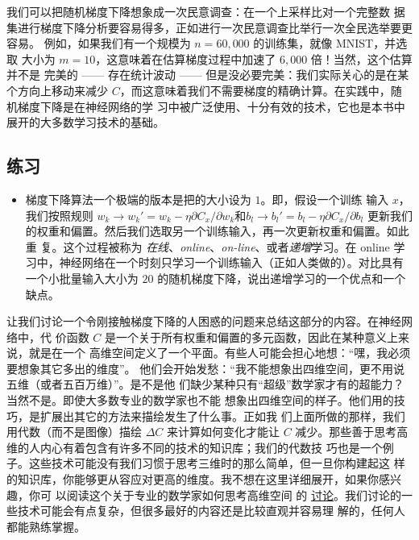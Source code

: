 我们可以把随机梯度下降想象成一次民意调查：在一个\minibatch{}上采样比对一个完整数
据集进行梯度下降分析要容易得多，正如进行一次民意调查比举行一次全民选举要更容易。
例如，如果我们有一个规模为 $n = 60,000$ 的训练集，就像 MNIST，并选取\minibatch{}
大小为 $m = 10$，这意味着在估算梯度过程中加速了 $6,000$ 倍！当然，这个估算并不是
完美的 —— 存在统计波动 —— 但是没必要完美：我们实际关心的是在某个方向上移动来减少
$C$，而这意味着我们不需要梯度的精确计算。在实践中，随机梯度下降是在神经网络的学
习中被广泛使用、十分有效的技术，它也是本书中展开的大多数学习技术的基础。

\subsection*{练习}

\begin{itemize}
\item 梯度下降算法一个极端的版本是把\minibatch{}的大小设为 $1$。即，假设一个训练
  输入 $x$，我们按照规则 $w_k \rightarrow w_k' = w_k - \eta \partial C_x /
  \partial w_k$和$b_l \rightarrow b_l' = b_l - \eta \partial C_x / \partial b_l$
  更新我们的权重和偏置。然后我们选取另一个训练输入，再一次更新权重和偏置。如此重
  复。这个过程被称为 \emph{在线}、\emph{online}、\emph{on-line}、或者\emph{递增}学习。在
  online 学习中，神经网络在一个时刻只学习一个训练输入（正如人类做的）。对比具有
  一个小批量输入大小为 $20$ 的随机梯度下降，说出递增学习的一个优点和一个缺点。
\end{itemize}

让我们讨论一个令刚接触梯度下降的人困惑的问题来总结这部分的内容。在神经网络中，代
价函数 $C$ 是一个关于所有权重和偏置的多元函数，因此在某种意义上来说，就是在一个
高维空间定义了一个平面。有些人可能会担心地想：“嘿，我必须要想象其它多出的维度”。
他们会开始发愁：“我不能想象出四维空间，更不用说五维（或者五百万维）”。是不是他
们缺少某种只有“超级”数学家才有的超能力？当然不是。即使大多数专业的数学家也不能
想象出四维空间的样子。他们用的技巧，是扩展出其它的方法来描绘发生了什么事。正如我
们上面所做的那样，我们用代数（而不是图像）描绘 $\Delta C$ 来计算如何变化才能让
$C$ 减少。那些善于思考高维的人内心有着包含有许多不同的技术的知识库；我们的代数技
巧也是一个例子。这些技术可能没有我们习惯于思考三维时的那么简单，但一旦你构建起这
样的知识库，你能够更从容应对更高的维度。我不想在这里详细展开，如果你感兴趣，你可
以阅读这个关于专业的数学家如何思考高维空间
的%
\href{http://mathoverflow.net/questions/25983/intuitive-crutches-for-higher-dimensional-thinking}{
  讨论}。我们讨论的一些技术可能会有点复杂，但很多最好的内容还是比较直观并容易理
解的，任何人都能熟练掌握。

